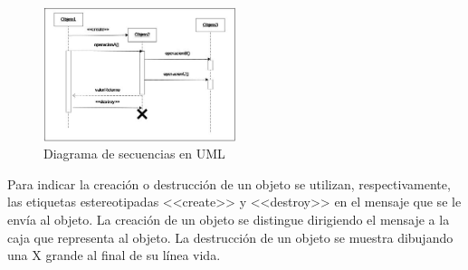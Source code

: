 \begin{figure}[ht!]  \centering
\includegraphics[width=0.5\textwidth]{images/fig23}
  \caption{Diagrama de secuencias en UML}
  \label{fig:23}
\end{figure}

Para indicar la creación o destrucción de un objeto se utilizan,
respectivamente, las etiquetas estereotipadas \textrm{<<create>>} y
\textrm{<<destroy>>} en el mensaje que se le envía al objeto. La
creación de un objeto se distingue dirigiendo el mensaje a la caja que
representa al objeto. La destrucción de un objeto se muestra dibujando
una X grande al final de su línea vida.
